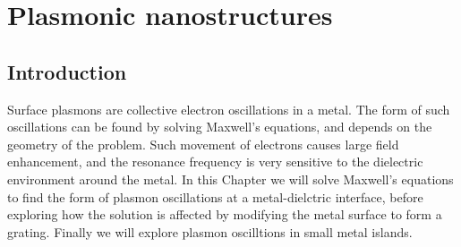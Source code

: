 
\chapter{Plasmonic nanostructures}

\graphicspath{{Chapter3/Figures/}}

\section{Introduction}
Surface plasmons are collective electron oscillations in a metal. The form of such oscillations can be found by solving Maxwell's equations, and depends on the geometry of the problem. Such movement of electrons causes large field enhancement, and the resonance frequency is very sensitive to the dielectric environment around the metal. In this Chapter we will solve Maxwell's equations to find the form of plasmon oscillations at a metal-dielctric interface, before exploring how the solution is affected by modifying the metal surface to form a grating. Finally we will explore plasmon oscilltions in small metal islands.

